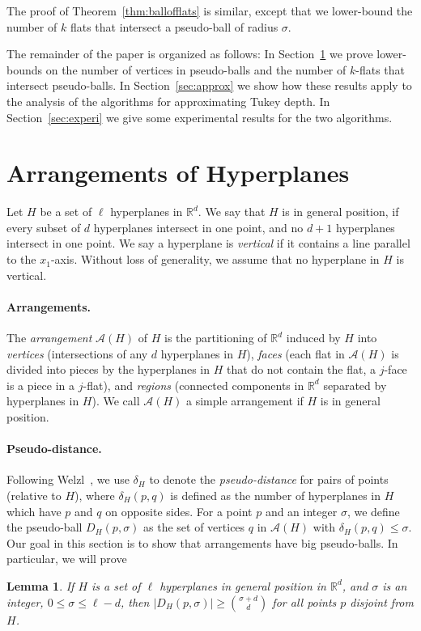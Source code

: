 \documentclass[preprint, 12pt]{elsarticle}
\newtheorem{lemma}{Lemma}%
\begin{document}
The proof of Theorem~\ref{thm:ballofflats} is similar, except that we
lower-bound the number of $k$ flats that intersect a pseudo-ball of radius $\sigma$.

The remainder of the paper is organized as follows:
In Section~\ref{sec:arran} we prove lower-bounds on the number of vertices in pseudo-balls and the number of $k$-flats that intersect pseudo-balls. In Section~\ref{sec:approx} we show how these results apply to the analysis of the algorithms for approximating Tukey depth. In Section~\ref{sec:experi} we give some experimental results for the two algorithms.

\section{Arrangements of Hyperplanes}
\label{sec:arran}

Let $H$ be a set of $\ell$ hyperplanes in $\mathbb{R}^{d}$. We say that $H$ is in general position, if every subset of $d$ hyperplanes intersect in one point, and no $d + 1$ hyperplanes intersect in one point. We say a hyperplane is \emph{vertical} if it contains a line parallel to the $x_{1}$-axis. Without loss of generality, we assume that no hyperplane in $H$ is vertical. 

\paragraph{Arrangements.}
The \emph{arrangement} $\mathcal{A}(H)$ of $H$ is the partitioning of $\mathbb{R}^{d}$ induced by $H$ into \emph{vertices} (intersections of any $d$ hyperplanes in $H$), \emph{faces} (each flat in $\mathcal{A}(H)$ is divided into pieces by the hyperplanes in $H$ that do not contain the flat, a $j$-face is a piece in a $j$-flat), and \emph{regions} (connected components in $\mathbb{R}^{d}$ separated by hyperplanes in $H$). We call $\mathcal{A}(H)$ a simple arrangement if $H$ is in general position. 

\paragraph{Pseudo-distance.}
Following Welzl~\cite{welzl92}, we use $\delta_{H}$ to denote the \emph{pseudo-distance} for pairs of points (relative to $H$), where $\delta_{H}(p,q)$ is defined as the number of hyperplanes in $H$ which have $p$ and $q$ on opposite sides. For a point $p$ and an integer $\sigma$, we define the pseudo-ball $D_{H}(p,\sigma)$ as the set of vertices $q$ in $\mathcal{A}(H)$ with $\delta_{H}(p,q) \leq \sigma$.
Our goal in this section is to show that arrangements have big pseudo-balls. In particular, we will prove
\begin{lemma}
\label{lem:ballofvertices}
  If $H$ is a set of $\ell$ hyperplanes in general position in $\mathbb{R}^{d}$, and $\sigma$ is an integer, $0 \leq \sigma \leq \ell - d$, then $|D_{H}(p,\sigma)| \geq \binom{\sigma+d}{d}$ for all points $p$ disjoint from $H$.
\end{lemma}
\end{document}
